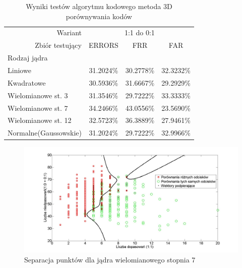     \begin{table}[!htb]
    \begin{tabular}{p{3cm}|r||c|c|c|}
	\cline{2-5}
    & Wariant & \multicolumn{3}{|c|}{1:1 do 0:1} \\ \cline{2-5} 
    & Zbiór testujący & ERRORS  & FRR & FAR\\ \hline
	\multicolumn{2}{|l||}{Rodzaj jądra} &  \multicolumn{3}{|c|}{}\\
	\hline\hline
    \multicolumn{2}{|l||}{Liniowe} & 31.2024\% & 30.2778\% & 32.3232\% \\ \hline
    \multicolumn{2}{|l||}{Kwadratowe} & 30.5936\% & 31.6667\% & 29.2929\%\\ \hline
    \multicolumn{2}{|l||}{Wielomianowe st. 3} & 31.3546\% & 29.7222\% & 33.3333\%\\ \hline
    \multicolumn{2}{|l||}{Wielomianowe st. 7} & 34.2466\% & 43.0556\% & 23.5690\%\\ \hline
    \multicolumn{2}{|l||}{Wielomianowe st. 12} & 32.5723\% & 36.3889\% & 27.9461\%\\ \hline
    \multicolumn{2}{|l||}{Normalne(Gaussowskie)} & 31.2024\% & 29.7222\% & 32.9966\%\\ \hline
    \end{tabular}
	\caption{Wyniki testów algorytmu kodowego metoda 3D porównywania kodów}
	\label{tab:3D_sample}	
    \end{table}
    
   \begin{figure}[!htb]
    \begin{center}
		\includegraphics[angle=0,scale=0.27]{img/SVM_polynominal_code_1.jpg}
		\caption{Separacja punktów dla jądra wielomianowego stopnia 7}
		\label{img:SVM_polynominal_code_1}
    \end{center}
    \end{figure}
    
